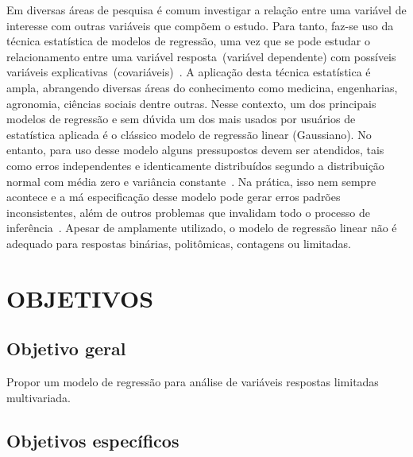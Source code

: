 
Em diversas áreas de pesquisa é comum investigar a relação entre uma
variável de interesse com outras variáveis que compõem o estudo. Para
tanto, faz-se uso da técnica estatística de modelos de regressão, uma
vez que se pode estudar o relacionamento entre uma variável
resposta~(variável dependente) com possíveis variáveis
explicativas~(covariáveis)~\cite{montgomery2012introduction}. A
aplicação desta técnica estatística é ampla, abrangendo diversas áreas
do conhecimento como medicina, engenharias, agronomia, ciências sociais
dentre outras. Nesse contexto, um dos principais modelos de regressão e
sem dúvida um dos mais usados por usuários de estatística aplicada é o
clássico modelo de regressão linear (Gaussiano). No entanto, para uso
desse modelo alguns pressupostos devem ser atendidos, tais como erros
independentes e identicamente distribuídos segundo a distribuição normal
com média zero e variância constante~\cite{draper2014applied}. Na
prática, isso nem sempre acontece e a má especificação desse modelo pode
gerar erros padrões inconsistentes, além de outros problemas que
invalidam todo o processo de
inferência~\cite{myersmontgomeryvining,montgomery2012introduction}.
Apesar de amplamente utilizado, o modelo de regressão linear não é
adequado para respostas binárias, politômicas, contagens ou limitadas.

\section{OBJETIVOS}

\subsection{Objetivo geral}

Propor um modelo de regressão para análise de variáveis respostas
limitadas multivariada.

\subsection{Objetivos específicos}

